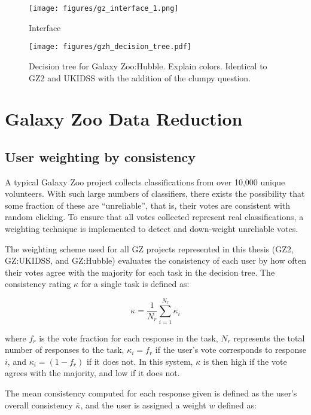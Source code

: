 \begin{figure}
\centering
\texttt{[image: figures/gz\_interface\_1.png]}
\caption{Interface}
\end{figure}

\begin{figure}
\centering
\texttt{[image: figures/gzh\_decision\_tree.pdf]}
\caption{Decision tree for Galaxy Zoo:Hubble. Explain colors. Identical to GZ2 and UKIDSS with the addition of the clumpy question.}
\end{figure}

\section{Galaxy Zoo Data Reduction}
\subsection{User weighting by consistency}
A typical Galaxy Zoo project collects classifications from over 10,000 unique volunteers. With such large numbers of classifiers, there exists the possibility that some fraction of these are ``unreliable'', that is, their votes are consistent with random clicking. To ensure that all votes collected represent real classifications, a weighting technique is implemented to detect and down-weight unreliable votes.

The weighting scheme used for all GZ projects represented in this thesis (GZ2, GZ:UKIDSS, and GZ:Hubble) evaluates the consistency of each user by how often their votes agree with the majority for each task in the decision tree. The consistency rating $\kappa$ for a single task is defined as:

\begin{equation}
\kappa = \frac{1}{N_{r}}\sum_{i=1}^{N_{r}}{\kappa_{i}}
\label{eqn:kappa}
\end{equation}

where $f_{r}$ is the vote fraction for each response in the task, $N_{r}$ represents the total number of responses to the task, $\kappa_{i} = f_{r}$ if the user's vote corresponds to response $i$, and $\kappa_{i} = (1-f_{r})$ if it does not. In this system, $\kappa$ is then high if the vote agrees with the majority, and low if it does not. 

The mean consistency computed for each response given is defined as the user's overall consistency $\bar{\kappa}$, and the user is assigned a weight $w$ defined as:


